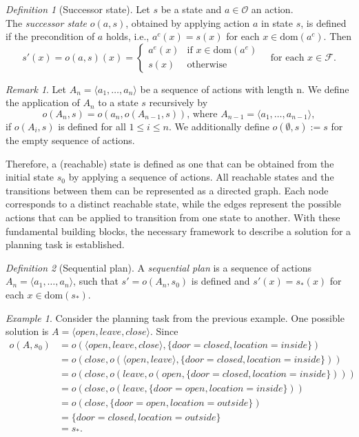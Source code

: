 \documentclass[
     11pt,                    %
     a4paper,             %
     BCOR=10mm,     %
     DIV=14,                 %
     listof=totoc,                    %
     bibliography=totoc,       %
     index=totoc,              %
     parskip            %
     twoside,
     headsepline
     ]{scrreprt}
\theoremstyle{definition}
\theoremstyle{definition}
\theoremstyle{remark}
\newtheorem{example}{\textit{Example}}
\newtheorem*{remark}{Remark}
\theoremstyle{bfnote}
\newtheorem{defi}{Definition}
\newcommand{\dom}{\mathrm{dom}}
\begin{document}
\begin{defi}[Successor state]
  Let $s$ be a state and $a \in \mathcal{O}$ an action.\\
  The \textit{successor state} $o(a,s)$, obtained by applying action $a$ in state $s$, is defined if the precondition of $a$ holds, i.e., $a^c(x) = s(x)$ for each $x \in \dom(a^c)$. Then
  \[
  s'(x) = o(a,s)(x) = \begin{cases} a^e(x) & \text{if } x \in \dom(a^e) \\ s(x) & \text{otherwise} \end{cases} \quad \text{for each } x \in \mathcal{F}.
  \]
\end{defi}
\begin{remark}
  Let $A_n = \langle a_1, \dots, a_n \rangle$ be a sequence of actions with length n. We define the application of $A_n$ to a state $s$ recursively by
  \[
    o(A_n,s) = o(a_n,o(A_{n-1},s)) \text{, where }A_{n-1} = \langle a_1, \dots, a_{n-1} \rangle,
  \]
  if $o(A_i, s)$ is defined for all $1 \le i \le n$. We additionally define $o(\emptyset, s) := s$ for the empty sequence of actions.
\end{remark}

Therefore, a (reachable) state is defined as one that can be obtained from the initial state $s_0$ by applying a sequence of actions.
All reachable states and the transitions between them can be represented as a directed graph. Each node corresponds to a distinct reachable state, while the edges represent the possible actions that can be applied to transition from one state to another.
With these fundamental building blocks, the necessary framework to describe a solution for a planning task is established.

\begin{defi}[Sequential plan]
  A \textit{sequential plan} is a sequence of actions $A_n = \langle a_1, \dots, a_n \rangle$, such that 
  $s' = o(A_n,s_0)$ is defined and $s'(x) = s_*(x)$ for each $x \in \dom(s_*)$.
\end{defi}

\begin{example}
  Consider the planning task from the previous example. One possible solution is $A = \langle open, leave, close \rangle$. Since
  \begin{align*}
    o(A, s_0) &= o(\langle open, leave, close \rangle, \{door{=}closed, location{=}inside\})\\
    &= o(close, o(\langle open, leave \rangle, \{door{=}closed, location{=}inside\}))\\
    &= o(close, o(leave, o(open, \{door{=}closed, location{=}inside\})))\\
    &= o(close, o(leave, \{door{=}open, location{=}inside\}))\\
    &= o(close, \{door{=}open, location{=}outside\})\\
    &= \{door{=}closed, location{=}outside\} \\ 
    &= s_*.
  \end{align*}
\end{example}
\hspace{-1.5em}
\end{document}
